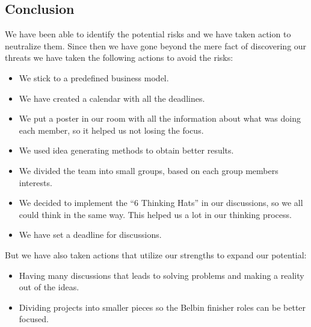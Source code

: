 \subsection{Conclusion}
We have been able to identify the potential risks and we have taken action to neutralize them. 
Since then we have gone beyond the mere fact of discovering our threats we have taken the following actions to avoid the risks:

\begin{itemize}[-]
\item We stick to a predefined business model.
\item We have created a calendar with all the deadlines.
\item We put a poster in our room with all the information about what was doing each member, so it helped us not losing the focus.
\item We used idea generating methods to obtain better results.
\item We divided the team into small groups, based on each group members interests.
\item We decided to implement the ``6 Thinking Hats'' in our discussions, so we all could think in the same way. This helped us a lot in our thinking process.
\item We have set a deadline for discussions.
\end{itemize}

But we have also taken actions that utilize our strengths to expand our potential:

\begin{itemize}[-]
\item Having many discussions that leads to solving problems and making a reality out of the ideas.
\item Dividing projects into smaller pieces so the Belbin finisher roles can be better focused. 
\end{itemize}
